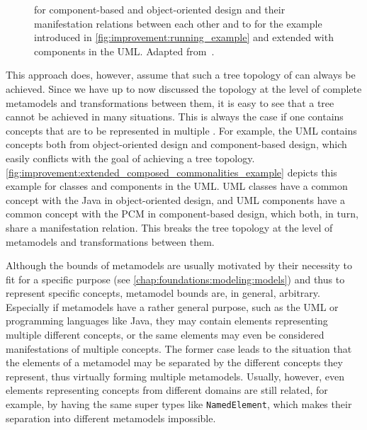 \begin{figure}
    \centering
    
    \caption[Example for tree topology of \commonalities]{\Conceptmetamodels for component-based and object-oriented design and their manifestation relations between each other and to \concretemetamodels for the example introduced in \autoref{fig:improvement:running_example} and extended with components in the \gls{UML}. Adapted from~.}
    \label{fig:improvement:extended_composed_commonalities_example}
\end{figure}

This approach does, however, assume that such a tree topology of \conceptmetamodels can always be achieved.
Since we have up to now discussed the topology at the level of complete metamodels and transformations between them, it is easy to see that a tree cannot be achieved in many situations.
This is always the case if one \concretemetamodel contains concepts that are to be represented in multiple \conceptmetamodels.
For example, the \gls{UML} contains concepts both from object-oriented design and component-based design, which easily conflicts with the goal of achieving a tree topology.
\autoref{fig:improvement:extended_composed_commonalities_example} depicts this example for classes and components in the \gls{UML}.
\gls{UML} classes have a common concept with the \concretemetamodels Java in object-oriented design, and \gls{UML} components have a common concept with the \concretemetamodel \gls{PCM} in component-based design, which both, in turn, share a manifestation relation. This breaks the tree topology at the level of metamodels and transformations between them.

Although the bounds of metamodels are usually motivated by their necessity to fit for a specific purpose (see \autoref{chap:foundations:modeling:models}) and thus to represent specific concepts, metamodel bounds are, in general, arbitrary.
Especially if metamodels have a rather general purpose, such as the \gls{UML} or programming languages like Java, they may contain elements representing multiple different concepts, or the same elements may even be considered manifestations of multiple concepts.
The former case leads to the situation that the elements of a metamodel may be separated by the different concepts they represent, thus virtually forming multiple metamodels.
Usually, however, even elements representing concepts from different domains are still related, for example, by having the same super types like \texttt{NamedElement}, which makes their separation into different metamodels impossible.

